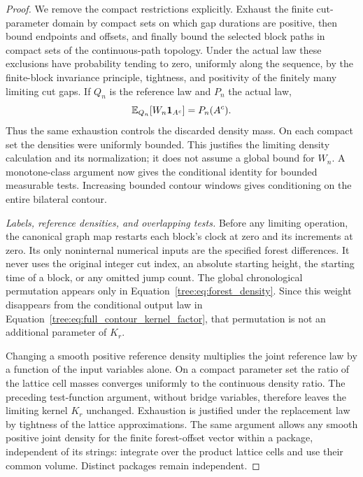 \begin{proof}
We remove the compact restrictions explicitly.  Exhaust the finite
cut-parameter domain by compact sets on which gap durations are
positive, then bound endpoints and offsets, and finally bound the
selected block paths in compact sets of the continuous-path topology.
Under the actual law these exclusions have probability tending to
zero, uniformly along the sequence, by the finite-block invariance
principle, tightness, and positivity of the finitely many limiting
cut gaps.  If $Q_n$ is the reference law and $P_n$ the actual law,
\[
 \mathbb E_{Q_n}[W_n\mathbf1_{A^c}]=P_n(A^c).
\]
Thus the same exhaustion controls the discarded density mass.
On each compact set the densities were uniformly bounded.  This
justifies the limiting density calculation and its normalization;
it does not assume a global bound for $W_n$.  A monotone-class
argument now gives the conditional identity for bounded measurable
tests.  Increasing bounded contour windows gives conditioning on
the entire bilateral contour.

\emph{Labels, reference densities, and overlapping tests.}
Before any limiting operation, the canonical graph map
restarts each block's clock at zero and its increments at zero.  Its
only noninternal numerical inputs are the specified forest differences.
It never uses the original integer cut index, an absolute starting
height, the starting time of a block, or any omitted jump count.
The global chronological permutation appears only in
Equation~\eqref{tree:eq:forest_density}.  Since this weight disappears
from the conditional output law in
Equation~\eqref{tree:eq:full_contour_kernel_factor}, that permutation is
not an additional parameter of $K_r$.

Changing a smooth positive reference density multiplies the joint
reference law by a function of the input variables alone. On a
compact parameter set the ratio of the lattice cell masses converges
uniformly to the continuous density ratio. The preceding test-function
argument, without bridge variables, therefore leaves the limiting
kernel $K_r$ unchanged. Exhaustion is justified under the replacement
law by tightness of the lattice approximations. The same argument
allows any smooth positive joint density for the finite forest-offset
vector within a package, independent of its strings: integrate over
the product lattice cells and use their common volume. Distinct
packages remain independent.


\end{proof}
